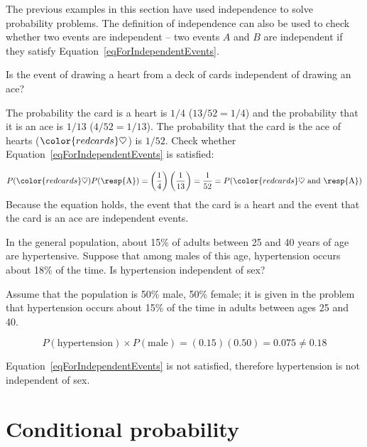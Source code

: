 The previous examples in this section have used independence to solve probability problems. The definition of independence can also be used to check whether two events are independent -- two events $A$ and $B$ are independent if they satisfy Equation~\eqref{eqForIndependentEvents}.

\begin{example}{Is the event of drawing a heart from a deck of cards independent of drawing an ace?}

The probability the card is a heart is $1/4$ ($13/52=1/4$) and the probability that it is an ace is $1/13$ ($4/52=1/13$). The probability that the card is the ace of hearts (${\color{redcards}\heartsuit}$) is $1/52$. Check whether Equation~\ref{eqForIndependentEvents} is satisfied:

\begin{align*}
P({\color{redcards}\heartsuit}) P(\text{\resp{A}}) = \left(\frac{1}{4} \right) \left( \frac{1}{13} \right) = \frac{1}{52} 
= P({\color{redcards}\heartsuit}\text{ and \resp{A}})
\end{align*}
Because the equation holds, the event that the card is a heart and the event that the card is an ace are independent events.
	
\end{example}

\begin{example}
 {In the general population, about 15\% of adults between 25 and 40  years of age are hypertensive.  Suppose that among males of this age, hypertension occurs about 18\% of the time.  Is hypertension independent of sex?} 

Assume that the population is 50\% male, 50\% female; it is given in the problem that hypertension occurs about 15\% of the time in adults between ages 25 and 40. 

\[P(\text{hypertension}) \times P(\text{male}) = (0.15)(0.50) = 0.075 \neq 0.18\] 

Equation~\ref{eqForIndependentEvents} is not satisfied, therefore hypertension is not independent of sex.

\label{hypertensionIndEx}

\end{example}



\section{Conditional probability}
\label{conditionalProbabilitySection}


